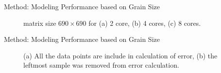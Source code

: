 \documentclass[10pt]{beamer}
\begin{document}
\begin{frame}{Method: Modeling Performance based on Grain Size}
\begin{outline}
\begin{figure}[H]
		\caption{matrix size $690\times690$ for (a) 2 core, (b) 4 cores, (c) 8 cores.}	
		\label{fig18}
	\end{figure}
	\end{outline}
\end{frame}

\begin{frame}{Method: Modeling Performance based on Grain Size}
	\begin{outline}
\begin{figure}[H]
	\centering
	\caption{(a) All the data points are include in calculation of error, (b) the leftmost sample was removed from error calculation.}	
	\label{fig17}
\end{figure}
	\end{outline}
\end{frame}
\end{document}
